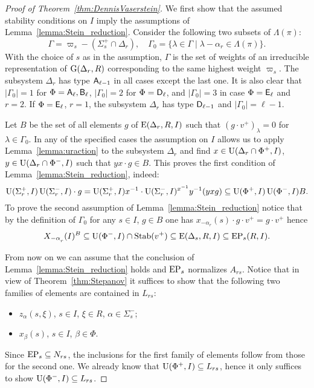 \begin{proof}[Proof of Theorem~\ref{thm:DennisVaserstein}]
We first show that the assumed stability conditions on $I$ imply the assumptions of Lemma~\ref{lemma:Stein_reduction}.
Consider the following two subsets of $\Lambda(\pi)$:
$$\Gamma = \varpi_s- (\Sigma_s^+\cap \Delta_r),\quad \Gamma_0 = \{\lambda \in \Gamma \mid \lambda - \alpha_r \in \Lambda(\pi) \}.$$
With the choice of $s$ as in the assumption, $\Gamma$ is the set of weights of an irreducible representation of $\operatorname{G}(\Delta_r, R)$ corresponding to the same highest weight $\varpi_s$.
The subsystem $\Delta_r$ has type $\mathsf{A}_{\ell-1}$ in all cases except the last one.
It is also clear that $|\Gamma_0|=1$ for $\Phi=\mathsf{A}_\ell, \mathsf{B}_\ell$, $|\Gamma_0|=2$ for $\Phi=\mathsf{D}_\ell$, and $|\Gamma_0|=3$ in case $\Phi=\mathsf{E}_\ell$ and $r=2$.
If $\Phi=\mathsf{E}_\ell$, $r=1$, the subsystem $\Delta_r$ has type $\mathsf{D}_{\ell-1}$ and $|\Gamma_0|=\ell-1$.

Let $B$ be the set of all elements $g$ of $\operatorname{E}(\Delta_r,R, I)$ such that $(g \cdot v^+)_\lambda = 0$ for $\lambda\in\Gamma_0$.
In any of  the specified cases the assumption on $I$ allows us to apply Lemma~\ref{lemma:uraction} to the subsystem $\Delta_r$ and find
$x\in\operatorname{U}(\Delta_r\cap\Phi^+, I)$, $y\in \operatorname{U}(\Delta_r\cap\Phi^-, I)$ such that $yx\cdot g \in B$.
This proves the first condition of Lemma~\ref{lemma:Stein_reduction}, indeed:
\[ \operatorname{U}(\Sigma^+_r, I) \operatorname{U}(\Sigma^-_r, I) \cdot g = \operatorname{U}(\Sigma^+_r, I) x^{-1} \cdot \operatorname{U}(\Sigma^-_r, I)^{x^{-1}} y^{-1} (yxg) \subseteq \operatorname{U}(\Phi^+, I) \operatorname{U}(\Phi^-, I) B. \]
To prove the second assumption of Lemma~\ref{lemma:Stein_reduction} notice that by the definition of $\Gamma_0$ for any $s\in I$, $ g\in B$ one has $x_{-\alpha_r}(s) \cdot g \cdot v^+ = g \cdot v^+$ hence
\[ X_{-\alpha\ssub{r}}(I)^{B} \subseteq \U(\Phi^-, I) \cap \Stab(v^+) \subseteq \E(\Delta_s, R, I) \subseteq \EP_s(R, I). \]

From now on we can assume that the conclusion of Lemma~\ref{lemma:Stein_reduction} holds and $\operatorname{EP}_s$ normalizes $A_{rs}$.
Notice that in view of Theorem~\ref{thm:Stepanov} it suffices to show that the following two families of elements are contained in $L_{rs}$:
\begin{itemize} \item $z_{\alpha}(s, \xi)$, $s\in I$, $\xi \in R$, $\alpha\in\Sigma^-_s$;
\item $x_{\beta}(s)$, $s \in I$, $\beta \in \Phi$. \end{itemize}
Since $\operatorname{EP}_s \subseteq N_{rs}$, the inclusions for the first family of elements follow from those for the second one.
We already know that $\operatorname{U}(\Phi^+, I) \subseteq L_{rs}$, hence it only suffices to show $\operatorname{U}(\Phi^-, I) \subseteq L_{rs}$.


\end{proof}

